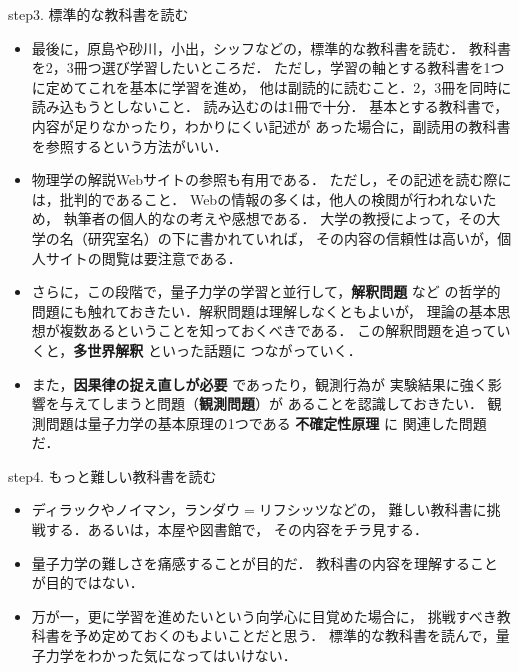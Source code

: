             \begin{mysmallsec}{step3. 標準的な教科書を読む}
                \begin{itemize}
                \item 最後に，原島や砂川，小出，シッフなどの，標準的な教科書を読む．
                      教科書を2，3冊つ選び学習したいところだ．
                      ただし，学習の軸とする教科書を1つに定めてこれを基本に学習を進め，
                      他は副読的に読むこと．2，3冊を同時に読み込もうとしないこと．
                      読み込むのは1冊で十分．
                      基本とする教科書で，内容が足りなかったり，わかりにくい記述が
                      あった場合に，副読用の教科書を参照するという方法がいい．
                \item 物理学の解説Webサイトの参照も有用である．
                      ただし，その記述を読む際には，批判的であること．
                      Webの情報の多くは，他人の検閲が行われないため，
                      執筆者の個人的なの考えや感想である．
                      大学の教授によって，その大学の名（研究室名）の下に書かれていれば，
                      その内容の信頼性は高いが，個人サイトの閲覧は要注意である．
                \item さらに，この段階で，量子力学の学習と並行して，\textbf{解釈問題} など
                      の哲学的問題にも触れておきたい．解釈問題は理解しなくともよいが，
                      理論の基本思想が複数あるということを知っておくべきである．
                      この解釈問題を追っていくと，\textbf{多世界解釈} といった話題に
                      つながっていく．
                \item また，\textbf{因果律の捉え直しが必要} であったり，観測行為が
                      実験結果に強く影響を与えてしまうと問題（\textbf{観測問題}）が
                      あることを認識しておきたい．
                      観測問題は量子力学の基本原理の1つである \textbf{不確定性原理} に
                      関連した問題だ．
                \end{itemize}
            \end{mysmallsec}

            \begin{mysmallsec}{step4. もっと難しい教科書を読む}
                \begin{itemize}
                \item ディラックやノイマン，ランダウ$=$リフシッツなどの，
                      難しい教科書に挑戦する．あるいは，本屋や図書館で，
                      その内容をチラ見する．
                \item 量子力学の難しさを痛感することが目的だ．
                      教科書の内容を理解することが目的ではない．
                \item 万が一，更に学習を進めたいという向学心に目覚めた場合に，
                      挑戦すべき教科書を予め定めておくのもよいことだと思う．
                      標準的な教科書を読んで，量子力学をわかった気になってはいけない．
                \end{itemize}
            \end{mysmallsec}

